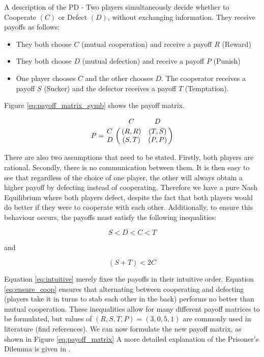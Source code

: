 A description of the PD - Two players simultaneously decide whether to Cooperate $(C)$ or Defect $(D)$, without exchanging information.
They receive payoffs as follows:

\begin{itemize}
\item They both choose $C$ (mutual cooperation) and receive a payoff $R$ (Reward)
\item They both choose $D$ (mutual defection) and receive a payoff $P$ (Punish)
\item One player chooses $C$ and the other chooses $D$. The cooperator receives a payoff $S$ (Sucker) and the defector receives a payoff $T$ (Temptation).
\end{itemize}

Figure \ref{eq:payoff_matrix_symb} shows the payoff matrix.

\begin{equation}\label{eq:payoff_matrix_symb}
%
P = \bordermatrix{~ & C & D \cr
                  C & (R, R) & (T, S) \cr
                  D & (S, T) & (P, P) \cr}
%
\end{equation}

There are also two assumptions that need to be stated.
Firstly, both players are rational.
Secondly, there is no communication between them.
It is then easy to see that regardless of the choice of one player, the other will always obtain a higher payoff by defecting instead of cooperating.
Therefore we have a pure Nash Equilibrium where both players defect, despite the fact that both players would do better if they were to cooperate with each other.
Additionally, to ensure this behaviour occurs, the payoffs must satisfy the following inequalities:

\begin{equation}\label{eq:intuitive}
S < D < C < T
\end{equation}

and

\begin{equation}\label{eq:ensure_coop}
(S + T) < 2 C
\end{equation}

Equation \ref{eq:intuitive} merely fixes the payoffs in their intuitive order.
Equation \ref{eq:ensure_coop} ensures that alternating between cooperating and defecting (players take it in turns to stab each other in the back) performs no better than mutual cooperation.
These inequalities allow for many different payoff matrices to be formulated, but values of $(R, S, T, P) = (3, 0, 5, 1)$ are commonly used in literature (find references). %
We can now formulate the new payoff matrix, as shown in Figure \ref{eq:payoff_matrix}
A more detailed explanation of the Prisoner's Dilemma is given in \cite{Gotts2003}.

